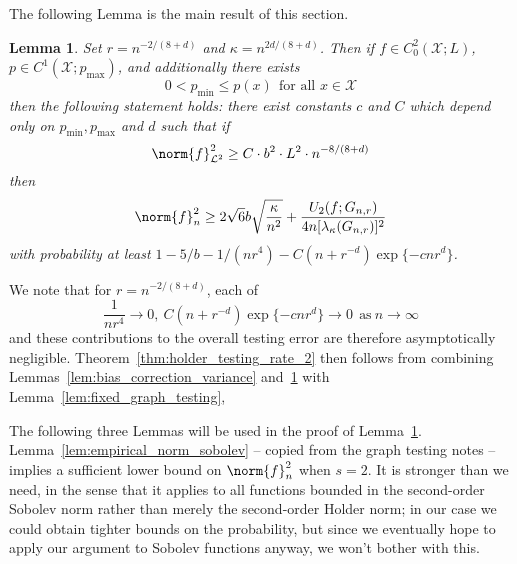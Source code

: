 \documentclass{article}
\newcommand{\1}{\mathbf{1}}
\newcommand{\Xset}{\mathcal{X}}
\newcommand{\Leb}{\mathcal{L}}
\theoremstyle{alden}
\theoremstyle{aldenthm}
\newtheorem{lemma}{Lemma}
\theoremstyle{definition}
\theoremstyle{remark}
\begin{document}
The following Lemma is the main result of this section.
\begin{lemma}
	\label{lem:approximation_error}
	Set $r = n^{-2/(8 + d)}$ and $\kappa = n^{2d/(8 + d)}$. Then if $f \in C_0^2(\mathcal{X};L)$, $p \in C^1(\mathcal{X};p_{\max})$, and additionally there exists
	\begin{equation*}
	0 < p_{\min} \leq p(x)~~\textrm{for all $x \in \Xset$}
	\end{equation*}
	then the following statement holds: there exist constants $c$ and $C$ which depend only on $p_{\min},p_{\max}$ and $d$ such that if
	\begin{equation}
	\label{eqn:approximation_error}
	\norm{f}_{\Leb^2}^2 \geq C \cdot b^2 \cdot L^2 \cdot n^{-8/(8 + d)}
	\end{equation}
	then
	\begin{equation*}
	\norm{f}_n^2 \geq  2 \sqrt{6} b\sqrt{\frac{\kappa}{n^2}} + \frac{U_2(f;G_{n,r})}{4 n [\lambda_{\kappa}(G_{n,r})]^2}
	\end{equation*}
	with probability at least $1 - 5/b - 1/(nr^4) - C(n + r^{-d}) \exp\{-c nr^d\}$.
\end{lemma}
We note that for $r = n^{-2/(8 + d)}$, each of
\begin{equation*}
\frac{1}{nr^4}\to 0,~ C(n + r^{-d}) \exp\{-c nr^d\} \to 0~~\textrm{as}~ n \to \infty
\end{equation*}
and these contributions to the overall testing error are therefore asymptotically negligible. Theorem~\ref{thm:holder_testing_rate_2} then follows from combining Lemmas~\ref{lem:bias_correction_variance} and~\ref{lem:approximation_error} with Lemma~\ref{lem:fixed_graph_testing}, 

The following three Lemmas will be used in the proof of Lemma~\ref{lem:approximation_error}. Lemma~\ref{lem:empirical_norm_sobolev} -- copied from the graph testing notes -- implies a sufficient lower bound on  $\norm{f}_n^2$ when $s = 2$. It is stronger than we need, in the sense that it applies to all functions bounded in the second-order Sobolev norm rather than merely the second-order Holder norm; in our case we could obtain tighter bounds on the probability, but since we eventually hope to apply our argument to Sobolev functions anyway, we won't bother with this.
\end{document}
